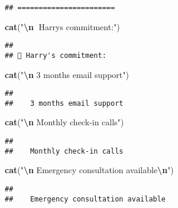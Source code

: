 \documentclass[
]{article}
\newenvironment{Shaded}{\begin{snugshade}}{\end{snugshade}}
\newcommand{\FunctionTok}[1]{\textcolor[rgb]{0.13,0.29,0.53}{\textbf{#1}}}
\newcommand{\NormalTok}[1]{#1}
\newcommand{\SpecialCharTok}[1]{\textcolor[rgb]{0.81,0.36,0.00}{\textbf{#1}}}
\newcommand{\StringTok}[1]{\textcolor[rgb]{0.31,0.60,0.02}{#1}}
\begin{document}
\begin{verbatim}
## =======================
\end{verbatim}

\begin{Shaded}
\begin{Highlighting}[]
\FunctionTok{cat}\NormalTok{(}\StringTok{"}\SpecialCharTok{\textbackslash{}n}\StringTok{📧 Harry\textquotesingle{}s commitment:"}\NormalTok{)}
\end{Highlighting}
\end{Shaded}

\begin{verbatim}
## 
## 📧 Harry's commitment:
\end{verbatim}

\begin{Shaded}
\begin{Highlighting}[]
\FunctionTok{cat}\NormalTok{(}\StringTok{"}\SpecialCharTok{\textbackslash{}n}\StringTok{   3 months email support"}\NormalTok{)}
\end{Highlighting}
\end{Shaded}

\begin{verbatim}
## 
##    3 months email support
\end{verbatim}

\begin{Shaded}
\begin{Highlighting}[]
\FunctionTok{cat}\NormalTok{(}\StringTok{"}\SpecialCharTok{\textbackslash{}n}\StringTok{   Monthly check{-}in calls"}\NormalTok{)}
\end{Highlighting}
\end{Shaded}

\begin{verbatim}
## 
##    Monthly check-in calls
\end{verbatim}

\begin{Shaded}
\begin{Highlighting}[]
\FunctionTok{cat}\NormalTok{(}\StringTok{"}\SpecialCharTok{\textbackslash{}n}\StringTok{   Emergency consultation available}\SpecialCharTok{\textbackslash{}n}\StringTok{"}\NormalTok{)}
\end{Highlighting}
\end{Shaded}

\begin{verbatim}
## 
##    Emergency consultation available
\end{verbatim}
\end{document}
